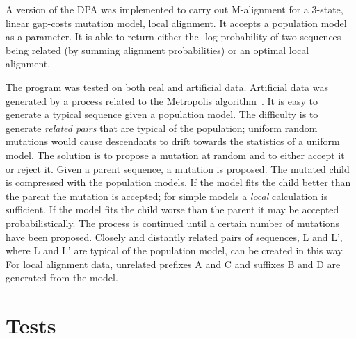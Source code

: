 \documentclass[letterpaper,11pt,oneside]{article}
\begin{document}
\begin{multicols}{2}
A version of the DPA was implemented to carry out M-alignment for
a 3-state, linear gap-costs mutation model, local alignment.
It accepts a population model as a parameter.
It is able to return either
the -log probability of two sequences being related
(by summing alignment probabilities) or
an optimal local alignment.

The program was tested on both real and artificial data.
Artificial data was generated by a process related to the
Metropolis algorithm~\cite{metropolis53}.
It is easy to generate a typical sequence given a population model.
The difficulty is to generate {\em related pairs} that are typical
of the population; uniform random mutations would cause
descendants to drift towards the statistics of a uniform model.
The solution is to propose a mutation at random and to either accept it
or reject it.
Given a parent sequence, a mutation is proposed.
The mutated child is compressed with the population models.
If the model fits the child better than the parent the mutation is accepted;
for simple models a {\em local} calculation is sufficient.
If the model fits the child worse than the parent it may be accepted
probabilistically.
The process is continued until a certain number of mutations have been proposed.
Closely and distantly related pairs of sequences, L and L',
where L and L' are typical of the population model, can be created in this way.
For local alignment data,
unrelated prefixes A and C and suffixes B and D are generated from the model.




 





\section{Tests}


\end{multicols}
\end{document}

